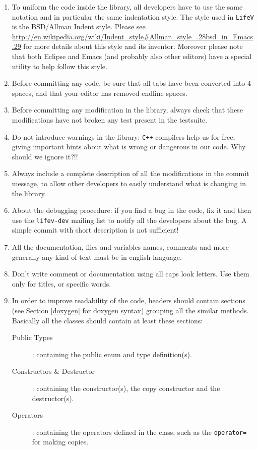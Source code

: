 \documentclass[a4paper]{article}
\begin{document}
\begin{enumerate}
  \item To uniform the code inside the library, all developers have to use the same notation and in particular the same indentation style. The style used in \texttt{LifeV} is the BSD/Allman Indent style. Please see \url{http://en.wikipedia.org/wiki/Indent_style#Allman_style_.28bsd_in_Emacs.29} for more details about this style and its inventor. Moreover please note that both Eclipse and Emacs (and probably also other editors) have a special utility to help follow this style.
  \item Before committing any code, be sure that all tabs have been converted into $4$ spaces, and that your editor has removed endline spaces.
  \item Before committing any modification in the library, always check that these modifications have not broken any test present in the testsuite.
  \item Do not introduce warnings in the library: \texttt{C++} compilers help us for free, giving important hints about what is wrong or dangerous in our code. Why should we ignore it?!!
  \item Always include a complete description of all the modifications in the commit message, to allow other developers to easily understand what is changing in the library.
  \item About the debugging procedure: if you find a bug in the code, fix it and then use the \texttt{lifev-dev} mailing list to notify all the developers about the bug. A simple commit with short description is not sufficient!
  \item All the documentation, files and variables names, comments and more generally any kind of text must be in english language.
  \item Don't write comment or documentation using all caps look letters. Use them only for titles, or specific words.
  \item In order to improve readability of the code, headers should contain sections (see Section \ref{doxygen} for doxygen syntax) grouping all the similar methods. Basically all the classes should contain at least these sections:
  \begin{description}
      \item[Public Types]: containing the public enum and type definition(s).
	  \item[Constructors \& Destructor]: containing the constructor(s), the copy constructor and the destructor(s).
      \item[Operators]: containing the operators defined in the class, such as the \texttt{operator=} for making copies.

\end{description}
\end{enumerate}
\end{document}
